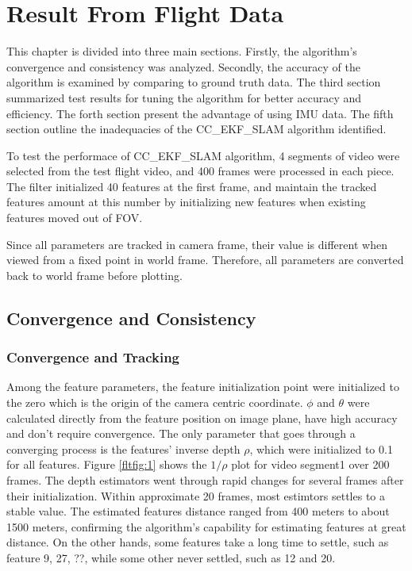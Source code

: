 \chapter{Result From Flight Data}\label{ch:FlightResult}

This chapter is divided into three main sections. Firstly, the
algorithm's convergence and consistency was analyzed. Secondly, the
accuracy of the algorithm is examined by comparing to ground truth
data. The third section summarized test results for tuning the
algorithm for better accuracy and efficiency. The forth section
present the advantage of using IMU data. The fifth section outline
the inadequacies of the CC\_EKF\_SLAM algorithm identified.

To test the performace of CC\_EKF\_SLAM algorithm, 4 segments of video
were selected from the test flight video, and 400 frames were
processed in each piece. The filter initialized 40 features at the
first frame, and maintain the tracked features amount at this number
by initializing new features when existing features moved out of FOV.

Since all parameters are tracked in camera frame, their value is 
different when viewed from a fixed point in world frame. Therefore, all 
parameters are converted back to world frame before plotting. 

\section{Convergence and Consistency}

\subsection{Convergence and Tracking}
Among the feature parameters, the feature initialization point were
initialized to the zero which is the origin of the camera centric
coordinate. $\phi$ and $\theta$ were calculated directly from the
feature position on image plane, have high accuracy and don't require
convergence. The only parameter that goes through a converging process
is the features' inverse depth $\rho$, which were initialized to 0.1
for all features. Figure \ref{fltfig:1} shows the $1/\rho$ plot for
video segment1 over 200 frames. The depth estimators went through
rapid changes for several frames after their initialization. Within
approximate 20 frames, most estimtors settles to a stable value. The
estimated features distance ranged from 400 meters to about 1500
meters, confirming the algorithm's capability for estimating features
at great distance. On the other hands, some features take a long time
to settle, such as feature 9, 27, ??, while some other never settled,
such as 12 and 20.

